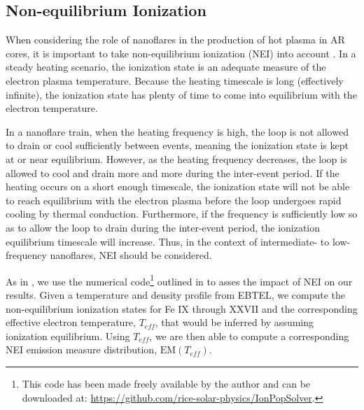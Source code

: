 \documentclass[preprint]{aastex}
\begin{document}
	\subsection{Non-equilibrium Ionization}
	\label{subsec:nei}
	\par When considering the role of nanoflares in the production of hot plasma in AR cores, it is important to take non-equilibrium ionization (NEI) into account \citep{bradshaw_explosive_2006,reale_nonequilibrium_2008,barnes_inference_2016}. In a steady heating scenario, the ionization state is an adequate measure of the electron plasma temperature. Because the heating timescale is long (effectively infinite), the ionization state has plenty of time to come into equilibrium with the electron temperature.
	\par In a nanoflare train, when the heating frequency is high, the loop is not allowed to drain or cool sufficiently between events, meaning the ionization state is kept at or near equilibrium. However, as the heating frequency decreases, the loop is allowed to cool and drain more and more during the inter-event period. If the heating occurs on a short enough timescale, the ionization state will not be able to reach equilibrium with the electron plasma before the loop undergoes rapid cooling by thermal conduction. Furthermore, if the frequency is sufficiently low so as to allow the loop to drain during the inter-event period, the ionization equilibrium timescale will increase. Thus, in the context of intermediate- to low-frequency nanoflares, NEI should be considered.
	\par As in , we use the numerical code\footnote{This code has been made freely available by the author and can be downloaded at: \url{https://github.com/rice-solar-physics/IonPopSolver}.} outlined in \citet{bradshaw_numerical_2009} to asses the impact of NEI on our results. Given a temperature and density profile from EBTEL, we compute the non-equilibrium ionization states for Fe IX through XXVII and the corresponding effective electron temperature, $T_{eff}$, that would be inferred by assuming ionization equilibrium. Using $T_{eff}$, we are then able to compute a corresponding NEI emission measure distribution, $\mathrm{EM}(T_{eff})$.
\end{document}
